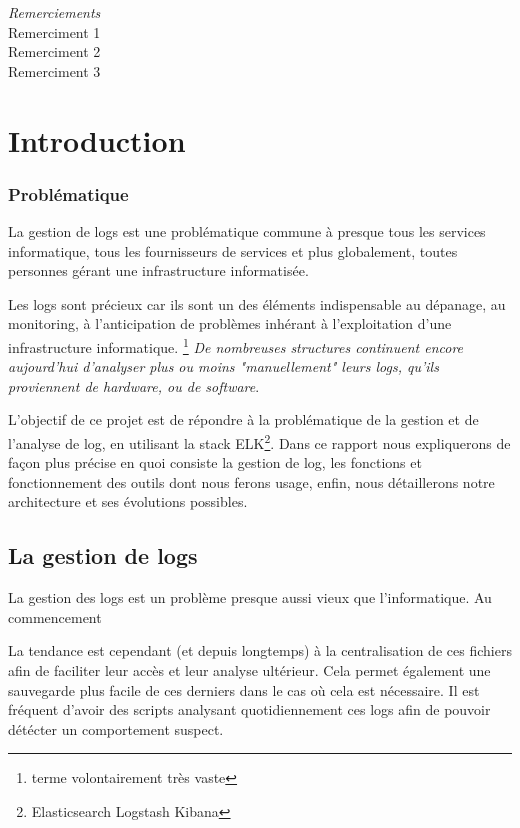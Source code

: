 \documentclass[a4paper,12pt,one side,titlepage]{report}
\begin{document}




\emph{\Large Remerciements}
\\[2cm]
Remerciment 1
\\[1cm]
Remerciment 2
\\[2cm]
Remerciment 3


\setcounter{tocdepth}{1}
\tableofcontents

\part{Introduction}

\section{Problématique}
La gestion de \gls{logs} est une problématique commune à presque tous les services informatique,
tous les fournisseurs de services et plus globalement, toutes personnes gérant une infrastructure 
informatisée.

Les \gls{logs} sont précieux car ils sont un des éléments indispensable au dépanage, au monitoring,
à l'anticipation de problèmes inhérant à l'exploitation d'une infrastructure informatique.
\footnote{terme volontairement très vaste}
\emph{De nombreuses structures continuent encore aujourd'hui d'analyser plus ou moins "manuellement" leurs
\emph{\gls{logs}}, qu'ils proviennent de \emph{hardware, ou de software}}.

L'objectif de ce projet est de répondre à la problématique de la gestion et de l'analyse de log, en utilisant
la stack ELK\footnote{Elasticsearch Logstash Kibana}.
Dans ce rapport nous expliquerons de façon plus précise en quoi consiste la gestion de log,
les fonctions et fonctionnement des outils dont nous ferons usage, enfin, nous détaillerons notre 
architecture et ses évolutions possibles.



\chapter{La gestion de logs}

La gestion des \gls{logs} est un problème presque aussi vieux que l'informatique.
Au commencement 

La tendance est cependant (et depuis longtemps) à la centralisation de ces fichiers afin de faciliter 
leur accès et leur analyse ultérieur. Cela permet également une sauvegarde plus facile de ces derniers 
dans le cas où cela est nécessaire. Il est fréquent d'avoir des scripts analysant 
quotidiennement ces \gls{logs} afin de pouvoir détécter un comportement suspect.
\end{document}
